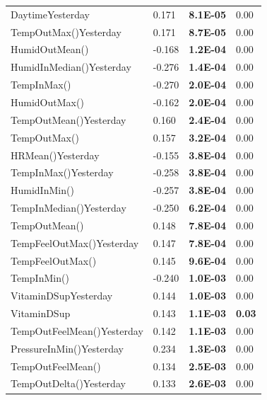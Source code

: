 \documentclass[conference]{IEEEtran}
\begin{document}
\begin{table}[]
\begin{tabular}{llll}
DaytimeYesterday               & 0.171  & \textbf{8.1E-05} & 0.00           \\
TempOutMax()Yesterday          & 0.171  & \textbf{8.7E-05} & 0.00           \\
HumidOutMean()                 & -0.168 & \textbf{1.2E-04} & 0.00           \\
HumidInMedian()Yesterday       & -0.276 & \textbf{1.4E-04} & 0.00           \\
TempInMax()                    & -0.270 & \textbf{2.0E-04} & 0.00           \\
HumidOutMax()                  & -0.162 & \textbf{2.0E-04} & 0.00           \\
TempOutMean()Yesterday         & 0.160  & \textbf{2.4E-04} & 0.00           \\
TempOutMax()                   & 0.157  & \textbf{3.2E-04} & 0.00           \\
HRMean()Yesterday              & -0.155 & \textbf{3.8E-04} & 0.00           \\
TempInMax()Yesterday           & -0.258 & \textbf{3.8E-04} & 0.00           \\
HumidInMin()                   & -0.257 & \textbf{3.8E-04} & 0.00           \\
TempInMedian()Yesterday        & -0.250 & \textbf{6.2E-04} & 0.00           \\
TempOutMean()                  & 0.148  & \textbf{7.8E-04} & 0.00           \\
TempFeelOutMax()Yesterday      & 0.147  & \textbf{7.8E-04} & 0.00           \\
TempFeelOutMax()               & 0.145  & \textbf{9.6E-04} & 0.00           \\
TempInMin()                    & -0.240 & \textbf{1.0E-03} & 0.00           \\
VitaminDSupYesterday           & 0.144  & \textbf{1.0E-03} & 0.00           \\
VitaminDSup                    & 0.143  & \textbf{1.1E-03} & \textbf{0.03}  \\
TempOutFeelMean()Yesterday     & 0.142  & \textbf{1.1E-03} & 0.00           \\
PressureInMin()Yesterday       & 0.234  & \textbf{1.3E-03} & 0.00           \\
TempOutFeelMean()              & 0.134  & \textbf{2.5E-03} & 0.00           \\
TempOutDelta()Yesterday        & 0.133  & \textbf{2.6E-03} & 0.00           \\

\end{tabular}
\end{table}
\end{document}
